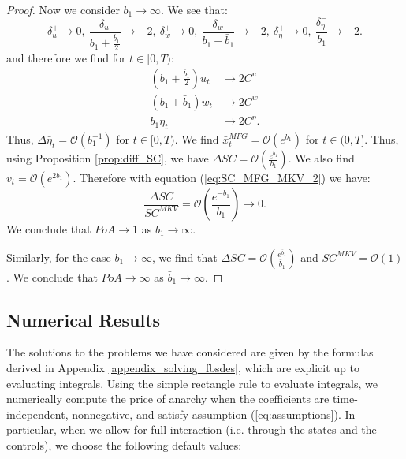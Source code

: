 \documentclass[11pt]{article}
\begin{document}
\begin{proof}
    Now we consider $b_1 \to \infty$. We see that:
    \begin{equation*}
        \delta^+_u \to 0,\ \frac{\delta^-_u}{b_1+\frac{\bar{b}_1}{2}} \to -2,\ \delta^+_w \to 0,\ \frac{\delta^-_w}{b_1+\bar{b}_1} \to -2,\ \delta^+_{\eta} \to 0,\ \frac{\delta^-_{\eta}}{b_1} \to -2.
    \end{equation*}
    and therefore we find for $t \in [0,T)$:
    \begin{equation*}
    \begin{split}
        \left(b_1+\frac{\bar{b}_1}{2}\right)u_t&\to 2 C^u \\
        \left(b_1+\bar{b}_1\right)w_t&\to 2 C^w \\
        b_1 \eta_t&\to 2 C^{\eta}.
    \end{split}
    \end{equation*}
    Thus, $\Delta \bar{\eta}_t=\mathcal{O}(b_1^{-1})$ for $t \in [0,T)$. We find $\bar{x}^{MFG}_t=\mathcal{O}(e^{b_1})$ for $t \in (0,T]$. Thus, using Proposition \ref{prop:diff_SC}, we have $\Delta SC=\mathcal{O}\left(\frac{e^{b_1}}{b_1}\right)$. We also find $v_t=\mathcal{O}(e^{2b_1})$. Therefore with equation (\ref{eq:SC_MFG_MKV_2}) we have:
    \begin{equation*}
        \frac{\Delta SC}{SC^{MKV}}=\mathcal{O}\left(\frac{e^{-b_1}}{b_1}\right)\to 0.
    \end{equation*}
    We conclude that $PoA \to 1$ as $b_1 \to \infty$.
    
    Similarly, for the case $\bar{b}_1 \to \infty$, we find that $\Delta SC=\mathcal{O}\left(\frac{e^{\bar{b}_1}}{\bar{b}_1}\right)$ and $SC^{MKV}=\mathcal{O}(1)$. We conclude that $PoA \to \infty$ as $\bar{b}_1 \to \infty$.
\end{proof}


\subsection{\textbf{Numerical Results}}
The solutions to the problems we have considered are given by the formulas derived in Appendix \ref{appendix_solving_fbsdes}, which are explicit up to evaluating integrals. Using the simple rectangle rule to evaluate integrals, we numerically compute the price of anarchy when the coefficients are time-independent, nonnegative, and satisfy assumption (\ref{eq:assumptions}). In particular, when we allow for full interaction (i.e. through the states and the controls), we choose the following default values:
\end{document}
